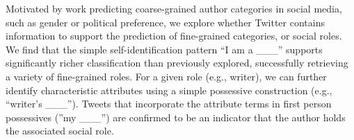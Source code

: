 Motivated by work predicting coarse-grained author categories in social media, such as gender or political preference, we explore whether Twitter contains information to support the prediction of fine-grained categories, or social roles. We find that the simple self-identification pattern ``I am a \_\_\_'' supports significantly richer classification than previously explored, successfully retrieving a variety of fine-grained roles. For a given role (e.g., writer), we can further identify characteristic attributes using a simple possessive construction (e.g., ``writer's \_\_\_''). Tweets that incorporate the attribute terms in first person possessives (''my \_\_\_'') are confirmed to be an indicator that the author holds the associated social role.
